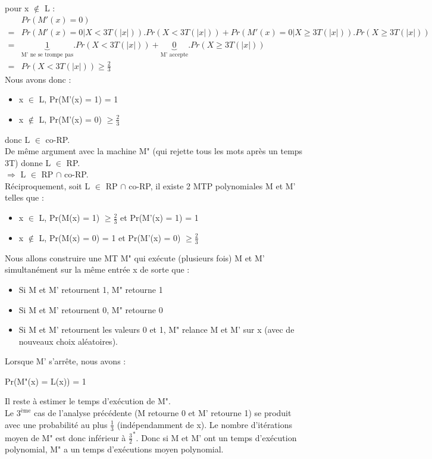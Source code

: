 \documentclass[12pt,a4paper]{article}
\begin{document}
pour x $\notin$ L :
\begin{equation}
\begin{split}\nonumber
& Pr(M'(x) = 0)\\
=& Pr(M'(x) = 0 | X < 3T(|x|)).Pr(X < 3T(|x|)) + Pr(M'(x) = 0 | X \geq 3T(|x|)).Pr(X \geq 3T(|x|))\\
=&\underbrace{1}_{\text{M' ne se trompe pas}}.Pr(X < 3T(|x|)) + \underbrace{0}_{\text{M' accepte}}.Pr(X \geq 3T(|x|))\\
=& Pr(X < 3T(|x|)) \geq \frac{2}{3}
\end{split}
\end{equation}
Nous avons donc :
\begin{itemize}
	\item x $\in$ L, Pr(M'(x) = 1) = 1
	\item x $\notin$ L, Pr(M'(x) = 0) $\geq \frac{2}{3}$
\end{itemize}
donc L $\in$ co-RP.\\
De même argument avec la machine M" (qui rejette tous les mots après un temps 3T) donne L $\in$ RP.\\
$\Longrightarrow$ L $\in$ RP $\cap$ co-RP.\\
Réciproquement, soit L $\in$ RP $\cap$ co-RP, il existe 2 MTP polynomiales M et M' telles que :
\begin{itemize}
	\item x $\in$ L, Pr(M(x) = 1) $\geq \frac{2}{3}$ et Pr(M'(x) = 1) = 1
	\item x $\notin$ L, Pr(M(x) = 0) = 1 et Pr(M'(x) = 0) $\geq \frac{2}{3}$
\end{itemize}
Nous allons construire une MT M" qui exécute (plusieurs fois) M et M' simultanément sur la même entrée x de sorte que :
\begin{itemize}
	\item Si M et M' retournent 1, M" retourne 1
	\item Si M et M' retournent 0, M" retourne 0
	\item Si M et M' retournent les valeurs 0 et 1, M" relance M et M' sur x (avec de nouveaux choix aléatoires).
\end{itemize}
Lorsque M' s'arrête, nous avons :
\begin{center}
	Pr(M"(x) = L(x)) = 1
\end{center}
Il reste à estimer le temps d'exécution de M".\\
Le $3^\text{ème}$ cas de l'analyse précédente (M retourne 0 et M' retourne 1) se produit avec une probabilité au plus $\frac{1}{3}$ (indépendamment de x). Le nombre d'itérations moyen de M" est donc inférieur à $\frac{3}{2}^*$. Donc si M et M' ont un temps d'exécution polynomial, M" a un temps d'exécutions moyen polynomial.\\
\end{document}
